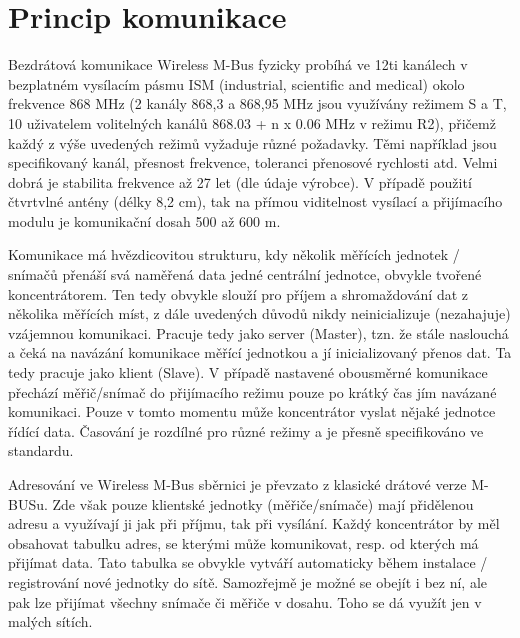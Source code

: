 
\section{Princip komunikace}

Bezdrátová komunikace Wireless M-Bus fyzicky probíhá ve 12ti kanálech v bezplatném vysílacím pásmu ISM (industrial, scientific and medical) okolo frekvence 868 MHz (2 kanály 868,3 a 868,95 MHz jsou využívány režimem S a T, 10 uživatelem volitelných kanálů 868.03 + n x 0.06 MHz v režimu R2), přičemž každý z výše uvedených režimů vyžaduje různé požadavky. Těmi například jsou specifikovaný kanál, přesnost frekvence, toleranci přenosové rychlosti atd. Velmi dobrá je stabilita frekvence až 27 let (dle údaje výrobce). V případě použití čtvrtvlné antény (délky 8,2 cm), tak na přímou viditelnost vysílací a přijímacího modulu je komunikační dosah 500 až 600 m.

Komunikace má hvězdicovitou strukturu, kdy několik měřících jednotek / snímačů přenáší svá naměřená data jedné centrální jednotce, obvykle tvořené koncentrátorem. Ten tedy obvykle slouží pro příjem a shromaždování dat z několika měřících míst, z dále uvedených důvodů nikdy neinicializuje (nezahajuje) vzájemnou komunikaci. Pracuje tedy jako server (Master), tzn. že stále naslouchá a čeká na navázání komunikace měřící jednotkou a jí inicializovaný přenos dat. Ta tedy pracuje jako klient (Slave). V případě nastavené obousměrné komunikace přechází měřič/snímač do přijímacího režimu pouze po krátký čas jím navázané komunikaci. Pouze v tomto momentu může koncentrátor vyslat nějaké jednotce řídící data. Časování je rozdílné pro různé režimy a je přesně specifikováno ve standardu.

Adresování ve Wireless M-Bus sběrnici je převzato z klasické drátové verze M-BUSu. Zde však pouze klientské jednotky (měřiče/snímače) mají přidělenou adresu a využívají ji jak při příjmu, tak při vysílání. Každý koncentrátor by měl obsahovat tabulku adres, se kterými může komunikovat, resp. od kterých má přijímat data. Tato tabulka se obvykle vytváří automaticky během instalace / registrování nové jednotky do sítě. Samozřejmě je možné se obejít i bez ní, ale pak lze přijímat všechny snímače či měřiče v dosahu. Toho se dá využít jen v malých sítích. 


